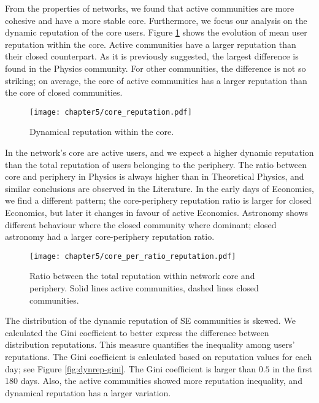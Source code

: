 From the properties of networks, we found that active communities are more cohesive and have a more stable core. Furthermore, we focus our analysis on the dynamic reputation of the core users. Figure \ref{fig:dr_core} shows the evolution of mean user reputation within the core. Active communities have a larger reputation than their closed counterpart. As it is previously suggested, the largest difference is found in the Physics community. For other communities, the difference is not so striking; on average, the core of active communities has a larger reputation than the core of closed communities. 

\begin{figure}[h]
	\centering
	\texttt{[image: chapter5/core\_reputation.pdf]}
	\caption{Dynamical reputation within the core.}
	\label{fig:dr_core}
\end{figure}

In the network's core are active users, and we expect a higher dynamic reputation than the total reputation of users belonging to the periphery. The ratio between core and periphery in Physics is always higher than in Theoretical Physics, and similar conclusions are observed in the Literature. In the early days of Economics, we find a different pattern; the core-periphery reputation ratio is larger for closed Economics, but later it changes in favour of active Economics. Astronomy shows different behaviour where the closed community where dominant; closed astronomy had a larger core-periphery reputation ratio. 

\begin{figure}[h!]
	\centering
	\texttt{[image: chapter5/core\_per\_ratio\_reputation.pdf]}
	\caption[Ratio between the total reputation within network core and periphery.]{Ratio between the total reputation within network core and periphery. Solid lines active communities, dashed lines closed communities.}
	\label{fig:dr_core_per}
\end{figure}

The distribution of the dynamic reputation of SE communities is skewed. We calculated the Gini coefficient to better express the difference between distribution reputations. This measure quantifies the inequality among users’ reputations. The Gini coefficient is calculated based on reputation values for each day; see Figure \ref{fig:dynrep-gini}. The Gini coefficient is larger than $0.5$ in the first 180 days. Also, the active communities showed more reputation inequality, and dynamical reputation has a larger variation. 

